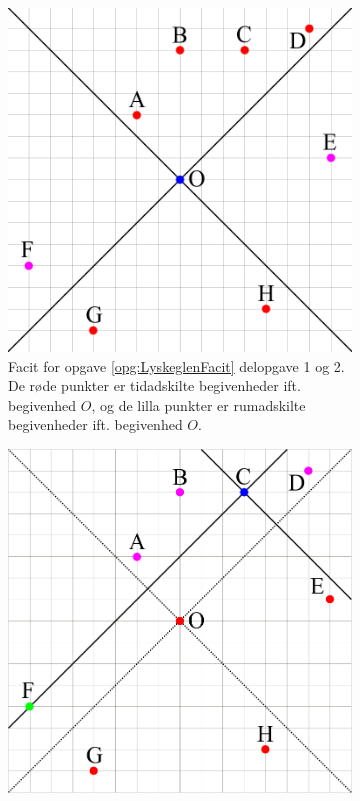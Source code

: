 \begin{figure}[t]
    \centering
    \begin{subfigure}[t]{.45\textwidth}
        \centering
        \includegraphics[width=\columnwidth]{facit/figurer/SR/LyskegleFacit1.png}
        \caption{Facit for opgave \ref{opg:LyskeglenFacit} delopgave 1 og 2. De røde punkter er tidadskilte begivenheder ift. begivenhed $O$, og de lilla punkter er rumadskilte begivenheder ift. begivenhed $O$.}
        \label{fig:LyskeglenFacit1}
    \end{subfigure}
    \hfill
    \begin{subfigure}[t]{.45\textwidth}
        \centering
        \includegraphics[width=\columnwidth]{facit/figurer/SR/LyskegleFacit3.png}

\end{subfigure}
\end{figure}
